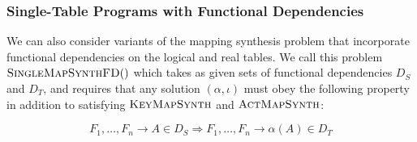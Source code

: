 \subsubsection{Single-Table Programs with Functional Dependencies}

We can also consider variants of the mapping synthesis problem that
incorporate functional dependencies on the logical and real tables. We
call this problem $\textsc{SingleMapSynthFD}()$ which takes as given
sets of functional dependencies $D_S$ and $D_T$, and requires that any
solution $(\alpha, \iota)$ must obey the following property in
addition to satisfying $\textsc{KeyMapSynth}$ and
$\textsc{ActMapSynth}$:

\[F_1,\ldots, F_n \to A \in D_S \Rightarrow F_1,\ldots,
  F_n \to \alpha(A) \in D_T\]

